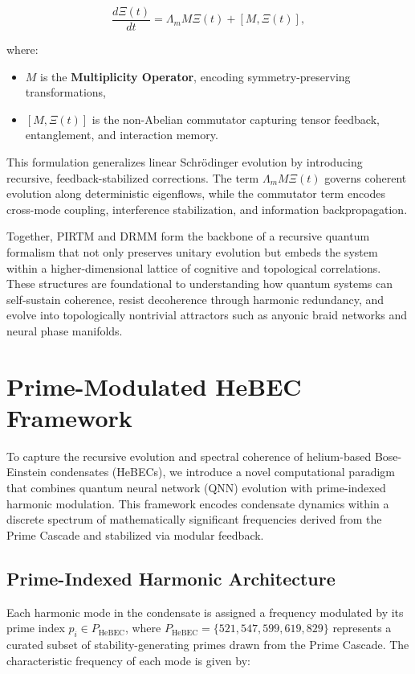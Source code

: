 \documentclass{article}
\theoremstyle{plain}
\begin{document}
\begin{equation}
\frac{d \Xi(t)}{dt} = \Lambda_m M \Xi(t) + [M, \Xi(t)],
\end{equation}

where:
\begin{itemize}
    \item \( M \) is the \textbf{Multiplicity Operator}, encoding symmetry-preserving transformations,
    \item \( [M, \Xi(t)] \) is the non-Abelian commutator capturing tensor feedback, entanglement, and interaction memory.
\end{itemize}

This formulation generalizes linear Schrödinger evolution by introducing recursive, feedback-stabilized corrections. The term \( \Lambda_m M \Xi(t) \) governs coherent evolution along deterministic eigenflows, while the commutator term encodes cross-mode coupling, interference stabilization, and information backpropagation.

Together, PIRTM and DRMM form the backbone of a recursive quantum formalism that not only preserves unitary evolution but embeds the system within a higher-dimensional lattice of cognitive and topological correlations. These structures are foundational to understanding how quantum systems can self-sustain coherence, resist decoherence through harmonic redundancy, and evolve into topologically nontrivial attractors such as anyonic braid networks and neural phase manifolds.

\section{Prime-Modulated HeBEC Framework}

To capture the recursive evolution and spectral coherence of helium-based Bose-Einstein condensates (HeBECs), we introduce a novel computational paradigm that combines quantum neural network (QNN) evolution with prime-indexed harmonic modulation. This framework encodes condensate dynamics within a discrete spectrum of mathematically significant frequencies derived from the Prime Cascade and stabilized via modular feedback.

\subsection{Prime-Indexed Harmonic Architecture}

Each harmonic mode in the condensate is assigned a frequency modulated by its prime index \( p_i \in P_{\text{HeBEC}} \), where \( P_{\text{HeBEC}} = \{521, 547, 599, 619, 829\} \) represents a curated subset of stability-generating primes drawn from the Prime Cascade. The characteristic frequency of each mode is given by:
\end{document}
